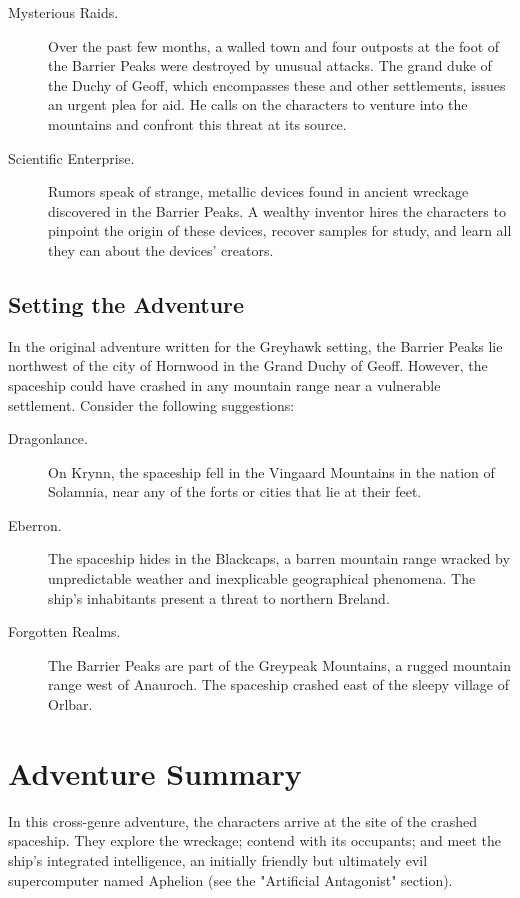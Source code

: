 \documentclass[10pt,a4paper,twoside,bg=print,twocolumn,openany,nodeprecatedcode]{dndbook}
\begin{document}
\begin{description}
\item[Mysterious Raids.]
Over the past few months, a walled town and four outposts at the foot of the Barrier Peaks were destroyed by unusual attacks. The grand duke of the Duchy of Geoff, which encompasses these and other settlements, issues an urgent plea for aid. He calls on the characters to venture into the mountains and confront this threat at its source.
\item[Scientific Enterprise.]
Rumors speak of strange, metallic devices found in ancient wreckage discovered in the Barrier Peaks. A wealthy inventor hires the characters to pinpoint the origin of these devices, recover samples for study, and learn all they can about the devices' creators.
\end{description}

\subsection{Setting the Adventure}
In the original adventure written for the Greyhawk setting, the Barrier Peaks lie northwest of the city of Hornwood in the Grand Duchy of Geoff. However, the spaceship could have crashed in any mountain range near a vulnerable settlement. Consider the following suggestions:


\begin{description}
\item[Dragonlance.]
On Krynn, the spaceship fell in the Vingaard Mountains in the nation of Solamnia, near any of the forts or cities that lie at their feet.
\item[Eberron.]
The spaceship hides in the Blackcaps, a barren mountain range wracked by unpredictable weather and inexplicable geographical phenomena. The ship's inhabitants present a threat to northern Breland.
\item[Forgotten Realms.]
The Barrier Peaks are part of the Greypeak Mountains, a rugged mountain range west of Anauroch. The spaceship crashed east of the sleepy village of Orlbar.
\end{description}

\section{Adventure Summary}
In this cross-genre adventure, the characters arrive at the site of the crashed spaceship. They explore the wreckage; contend with its occupants; and meet the ship's integrated intelligence, an initially friendly but ultimately evil supercomputer named Aphelion (see the "Artificial Antagonist" section).
\end{document}
